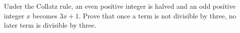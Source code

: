Under the Collatz rule, an even positive integer is halved and an odd positive integer $x$ becomes $3x+1$. Prove that once a term is not divisible by three, no later term is divisible by three.
